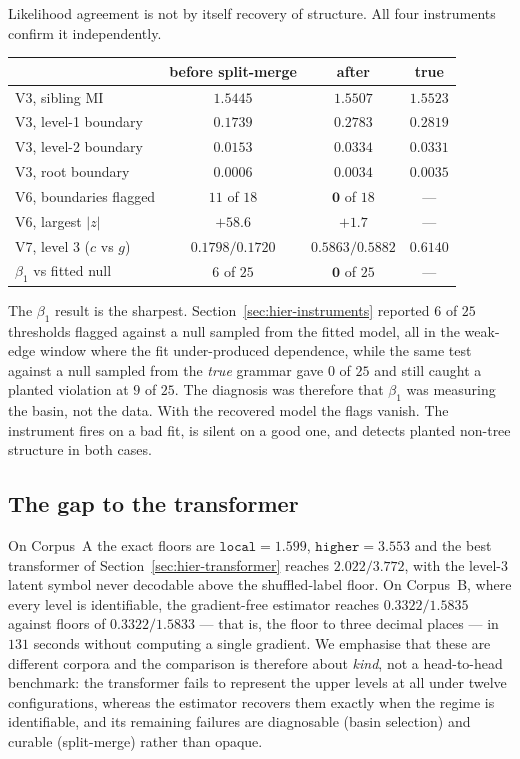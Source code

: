 Likelihood agreement is not by itself recovery of structure. All four
instruments confirm it independently.

\begin{center}
\begin{tabular}{lccc}
\toprule
 & before split-merge & after & true \\
\midrule
V3, sibling MI               & $1.5445$ & $1.5507$ & $1.5523$ \\
V3, level-1 boundary         & $0.1739$ & $0.2783$ & $0.2819$ \\
V3, level-2 boundary         & $0.0153$ & $0.0334$ & $0.0331$ \\
V3, root boundary            & $0.0006$ & $0.0034$ & $0.0035$ \\
V6, boundaries flagged       & $11$ of $18$ & $\mathbf{0}$ of $18$ & --- \\
V6, largest $|z|$            & $+58.6$ & $+1.7$ & --- \\
V7, level 3 ($c$ vs $g$)     & $0.1798/0.1720$ & $0.5863/0.5882$ & $0.6140$ \\
$\beta_1$ vs fitted null     & $6$ of $25$ & $\mathbf{0}$ of $25$ & --- \\
\bottomrule
\end{tabular}
\end{center}

\noindent
The $\beta_1$ result is the sharpest. Section~\ref{sec:hier-instruments}
reported $6$ of $25$ thresholds flagged against a null sampled from the fitted
model, all in the weak-edge window where the fit under-produced dependence,
while the same test against a null sampled from the \emph{true} grammar gave
$0$ of $25$ and still caught a planted violation at $9$ of $25$. The diagnosis
was therefore that $\beta_1$ was measuring the basin, not the data. With the
recovered model the flags vanish. The instrument fires on a bad fit, is silent
on a good one, and detects planted non-tree structure in both cases.

\subsection{The gap to the transformer}

On Corpus~A the exact floors are $\texttt{local}=1.599$, $\texttt{higher}=3.553$
and the best transformer of Section~\ref{sec:hier-transformer} reaches
$2.022/3.772$, with the level-3 latent symbol never decodable above the
shuffled-label floor. On Corpus~B, where every level is identifiable, the
gradient-free estimator reaches $0.3322/1.5835$ against floors of
$0.3322/1.5833$ --- that is, the floor to three decimal places --- in $131$
seconds without computing a single gradient. We emphasise that these are
different corpora and the comparison is therefore about \emph{kind}, not a
head-to-head benchmark: the transformer fails to represent the upper levels at
all under twelve configurations, whereas the estimator recovers them exactly
when the regime is identifiable, and its remaining failures are diagnosable
(basin selection) and curable (split-merge) rather than opaque.


